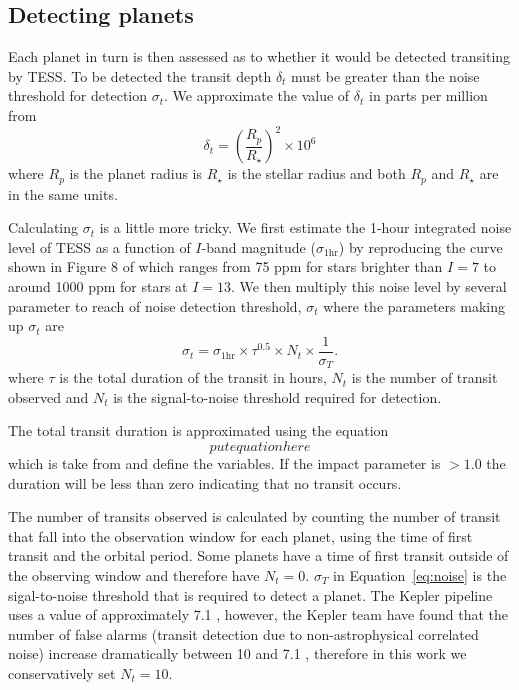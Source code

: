 \documentclass[iop,apj]{emulateapj}
\begin{document}
\subsection{Detecting planets}
Each planet in turn is then assessed as to whether it would be detected transiting by TESS. To be detected the transit depth $\delta_t$ must be greater than the noise threshold for detection $\sigma_t$. We approximate the value of $\delta_t$ in parts per million from
\begin{equation}
\delta_t = \left(\frac{R_p}{R_\star}\right)^2 \times 10^6
\end{equation}
where $R_p$ is the planet radius is $R_\star$ is the stellar radius and both $R_p$ and $R_\star$ are in the same units.

Calculating $\sigma_t$ is a little more tricky. We first estimate the 1-hour integrated noise level of TESS as a function of $I$-band magnitude ($\sigma_{\textrm{1hr}}$) by reproducing the curve shown in Figure 8 of \citet{ricker14} which ranges from 75 ppm for stars brighter than $I=7$ to around 1000 ppm for stars at $I=13$. We then multiply this noise level by several parameter to reach of noise detection threshold, $\sigma_t$ where the parameters making up $\sigma_t$ are
\begin{equation}
\sigma_t = \sigma_{\textrm{1hr}} \times \tau^{0.5} \times N_t \times \frac{1}{\sigma_T}.
\label{eq:noise}
\end{equation}
where $\tau$ is the total duration of the transit in hours, $N_t$ is the number of transit observed and $N_t$ is the signal-to-noise threshold required for detection.

The total transit duration is approximated using the equation
\begin{equation}
put equation here
\end{equation}
which is take from \citet{winn13} and define the variables. If the impact parameter is $>1.0$ the duration will be less than zero indicating that no transit occurs.

The number of transits observed is calculated by counting the number of transit that fall into the observation window for each planet, using the time of first transit and the orbital period. Some planets have a time of first transit outside of the observing window and therefore have $N_t=0$. $\sigma_T$ in Equation~\ref{eq:noise} is the sigal-to-noise threshold that is required to detect a planet. The Kepler pipeline uses a value of approximately 7.1 \citep{a bunch of jenkins papers,jenkins15}, however, the Kepler team have found that the number of false alarms (transit detection due to non-astrophysical correlated noise) increase dramatically between 10 and 7.1 \citet{mullally15}, therefore in this work we conservatively set $N_t=10$. 
\end{document}
